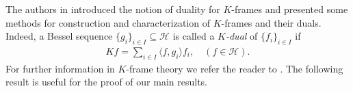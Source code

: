 \documentclass{birkjour}
\newtheorem{lem}[thm]{Lemma}
\newtheorem{prop}[thm]{Proposition}
\theoremstyle{definition}
\theoremstyle{remark}
\numberwithin{equation}{section}
\begin{document}
The authors in \cite{arefi3} introduced the notion of duality for $K$-frames and presented some methods for construction and characterization of $K$-frames and their duals. Indeed, a Bessel sequence
 $\{g_{i}\}_{i \in I}\subseteq \mathcal{H}$ is called a \textit{$K$-dual} of $\{ f_{i} \}_{i\in I}$ if
\begin{eqnarray}\label{dual1}
Kf = \sum_{i\in I} \langle f,g_{i}\rangle f_{i}, \quad (f\in \mathcal{H}).
\end{eqnarray}
 For further information in $K$-frame theory  we refer the reader  to  \cite{arefi3, Han, Gav07,  Xiao}. The following result  is useful for the proof of  our main results.

\end{document}
